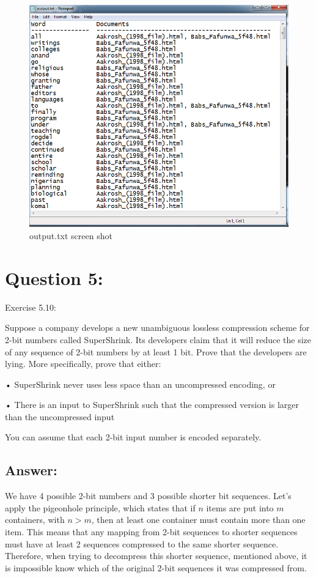 \documentclass[a4paper, 11pt]{article}
\begin{document}
\begin{figure}[h]
\caption{output.txt screen shot}
\centering
\includegraphics[scale=0.7]{Q4/output.png}
\end{figure}



\section*{Question 5:}
Exercise 5.10: 

Suppose a company develops a new unambiguous lossless compression scheme for 2-bit numbers called SuperShrink. Its developers claim that it will reduce the size of any sequence of 2-bit numbers by at least 1 bit. Prove that the developers are lying. More specifically, prove that either:

• SuperShrink never uses less space than an uncompressed encoding, or

• There is an input to SuperShrink such that the compressed version is larger than the uncompressed input

You can assume that each 2-bit input number is encoded separately.

\subsection*{Answer:}

We have 4 possible 2-bit numbers and 3 possible shorter bit sequences. Let's apply the pigeonhole principle, which states that if $n$ items are put into $m$ containers, with $n > m$, then at least one container must contain more than one item. This means that any mapping from 2-bit sequences to shorter sequences must have at least 2 sequences compressed to the same shorter sequence. Therefore, when trying to decompress this shorter sequence, mentioned above, it is impossible know which of the original 2-bit sequences it was compressed from.
\end{document}
